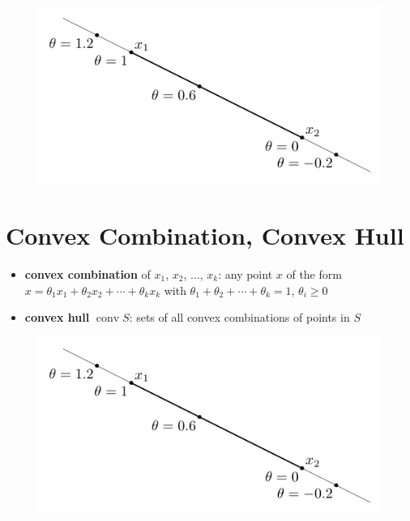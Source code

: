 \documentclass[11pt]{extarticle}
\DeclareMathOperator*{\conv}{conv}
\theoremstyle{definition}
\begin{document}
\begin{figure}[!htbp]
  \centering
  \includegraphics[scale=1,page=2]{fig/02.pdf}
\end{figure}

\newpage

\section*{Convex Combination, Convex Hull}

\begin{itemize}
  \item {\bf convex combination} of $x_1$, $x_2$, $\ldots$, $x_k$: any point $x$ of the form $x = \theta_1 x_1 + \theta_2 x_2 + \cdots + \theta_k x_k$ with $\theta_1 + \theta_2 + \cdots + \theta_k = 1$, $\theta_i\geqslant 0$
  \item {\bf convex hull} $\conv S$: sets of all convex combinations of points in $S$
\end{itemize}

\begin{figure}[!htbp]
  \centering
  \includegraphics[scale=1,page=3]{fig/02.pdf}
\end{figure}
\end{document}
